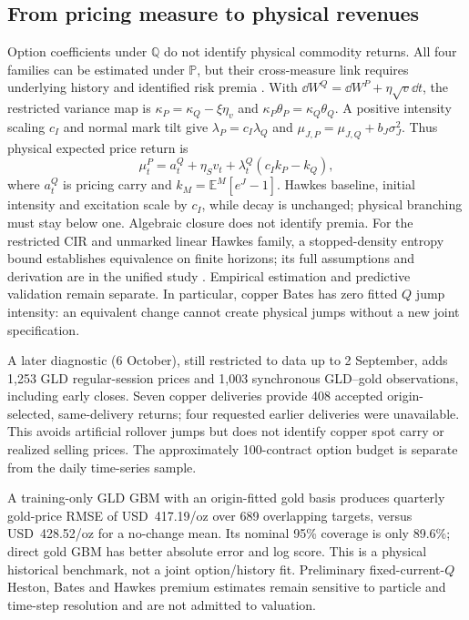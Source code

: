 \subsection{From pricing measure to physical revenues}
\label{sec:paper-physical-measure}
Option coefficients under $\mathbb Q$ do not identify physical commodity
returns. All four families can be estimated under $\mathbb P$, but their
cross-measure link requires underlying history and identified risk premia
\citep{pan2002}. With
$\dd W^Q=\dd W^P+\eta\sqrt v\dd t$, the restricted variance map is
$\kappa_P=\kappa_Q-\xi\eta_v$ and
$\kappa_P\theta_P=\kappa_Q\theta_Q$.
A positive intensity scaling $c_I$ and normal mark tilt give
$\lambda_P=c_I\lambda_Q$ and
$\mu_{J,P}=\mu_{J,Q}+b_J\sigma_J^2$. Thus physical expected price return is
\begin{equation}
\mu_t^P=a_t^Q+\eta_Sv_t+
\lambda_t^Q(c_Ik_P-k_Q),
\label{eq:paper-physical-drift}
\end{equation}
where $a_t^Q$ is pricing carry and $k_M=\mathbb E^M[e^J-1]$.
Hawkes baseline, initial intensity and excitation scale by $c_I$, while
decay is unchanged; physical branching must stay below one. Algebraic
closure does not identify premia. For the restricted CIR and unmarked linear
Hawkes family, a stopped-density entropy bound establishes equivalence on
finite horizons; its full assumptions and derivation are in the unified
study \citep{schonbucher2001,sokol-hansen2015}. Empirical estimation and
predictive validation remain separate. In
particular, copper Bates has zero fitted $Q$ jump intensity: an equivalent
change cannot create physical jumps without a new joint specification.

A later diagnostic (6 October), still restricted to data up to 2 September, adds 1,253 GLD
regular-session prices and 1,003 synchronous GLD--gold observations,
including early closes. Seven copper deliveries provide 408 accepted
origin-selected, same-delivery returns; four requested earlier deliveries
were unavailable. This avoids artificial rollover jumps but does not
identify copper spot carry or realized selling prices. The approximately
100-contract option budget is separate from the daily time-series sample.

A training-only GLD GBM with an origin-fitted gold basis produces quarterly
gold-price RMSE of USD~417.19/oz over 689 overlapping targets, versus
USD~428.52/oz for a no-change mean. Its nominal 95\% coverage is only
89.6\%; direct gold GBM has better absolute error and log score. This is a
physical historical benchmark, not a joint option/history fit. Preliminary
fixed-current-$Q$ Heston, Bates and Hawkes premium estimates remain sensitive
to particle and time-step resolution and are not admitted to valuation.

